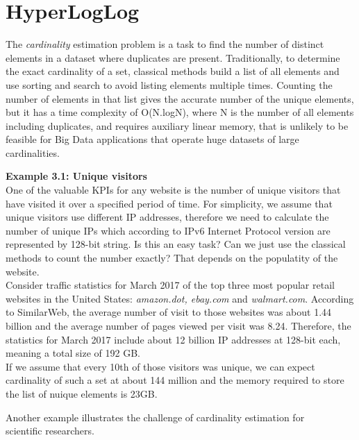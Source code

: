 \documentclass[a4paper,13pt]{article}
\theoremstyle{mytheor}
\begin{document}
\section{HyperLogLog}
The \textit{cardinality} estimation problem is a task to find the number of distinct
elements in a dataset where duplicates are present. Traditionally, to
determine the exact cardinality of a set, classical methods build a list
of all elements and use sorting and search to avoid listing elements
multiple times. Counting the number of elements in that list gives the accurate
number of the unique elements, but it has a time complexity of O(N.logN), where
N is the number of all elements including duplicates, and requires auxiliary 
linear memory, that is unlikely to be feasible for Big Data applications that
operate huge datasets of large cardinalities.
\begin{mdframed}
   \textbf{Example 3.1: Unique visitors}\\
   One of the valuable KPIs for any website is the number of unique visitors
   that have visited it over a specified period of time. For simplicity, we
   assume that unique visitors use different IP addresses, therefore we need
   to calculate the number of unique IPs which according to IPv6 Internet Protocol
   version are represented by 128-bit string. Is this an easy task?
   Can we just use the classical methods to count the number exactly? That
   depends on the populatity of the website.\\
   Consider traffic statistics for March 2017 of the top three most popular
   retail websites in the United States: \textit{amazon.dot, ebay.com} and
   \textit{walmart.com}. According to SimilarWeb, the average number of visit to
   those websites was about 1.44 billion and the average number of pages
   viewed per visit was 8.24. Therefore, the statistics for March 2017 include
   about 12 billion IP addresses at 128-bit each, meaning a total size of
   192 GB.\\
   If we assume that every 10th of those visitors was unique, we can expect
   cardinality of such a set at about 144 million and the memory required to
   store the list of nuique elements is 23GB.
\end{mdframed}
\break
Another example illustrates the challenge of cardinality estimation for\\
scientific researchers.
\end{document}
